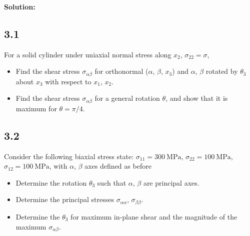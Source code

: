 \documentclass[12pt]{article}
\begin{document}
\textbf{Solution:}



\subsection{3.1}
For a solid cylinder under uniaxial normal stress along $x_2$, $\sigma_{22} = \sigma$,
\begin{itemize}
    \item Find the shear stress $\sigma_{\alpha\beta}$ for orthonormal ($\alpha$, $\beta$, $x_3$)
          and $\alpha$, $\beta$ rotated by $\theta_3$ about $x_3$ with respect to $x_1$, $x_2$.
    \item Find the shear stress $\sigma_{\alpha\beta}$ for a general rotation $\theta$,
          and show that it is maximum for $\theta = \pi/4$.
\end{itemize}


\subsection{3.2}
Consider the following biaxial stress state: $\sigma_{11} = \SI{300}{\mega\pascal}$,
$\sigma_{22} = \SI{100}{\mega\pascal}$, $\sigma_{12} = \SI{100}{\mega\pascal}$,
with $\alpha$, $\beta$ axes defined as before
\begin{itemize}
    \item Determine the rotation $\theta_3$ such that $\alpha$, $\beta$ are principal axes.
    \item Determine the principal stresses $\sigma_{\alpha\alpha}$, $\sigma_{\beta\beta}$.
    \item Determine the $\theta_3$ for maximum in-plane shear and the magnitude of the maximum $\sigma_{\alpha\beta}$.
\end{itemize}
\end{document}
